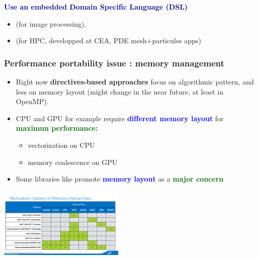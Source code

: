 \begin{frame}
\begin{itemize}
\begin{itemize}
\begin{itemize}
      \end{itemize}
    \end{itemize}
  {\small \item \textcolor{darkblue}{\textbf{Use an embedded Domain Specific Language (DSL)}}
    \begin{itemize}
    \item {} (for image processing),
    \item {} (for HPC, developped at CEA, PDE mesh+particules apps)
    \end{itemize}}
  \end{itemize}

  {\small {}}
  
\end{frame}


\begin{frame}
  \frametitle{Performance portability issue : memory management}

  \begin{itemize}
  \item Right now \textbf{directives-based approaches} focus on algorithmic pattern, and less on memory layout (might change in the near future, at least in OpenMP).
  \item CPU and GPU for example require \textcolor{blue}{\textbf{different memory layout}} for \textcolor{darkgreen}{\textbf{maximun performance:}}
    \begin{itemize}
    \item vectorization on CPU
    \item memory coalescence on GPU
    \end{itemize}
  \item Some libraries like  promote \textcolor{blue}{\textbf{memory layout}} as a \textcolor{darkgreen}{\textbf{major concern}}
  \end{itemize}

  \begin{center}
    \includegraphics[width=6cm]{doc/openmp/omp_memory}
  \end{center}


\end{frame}

